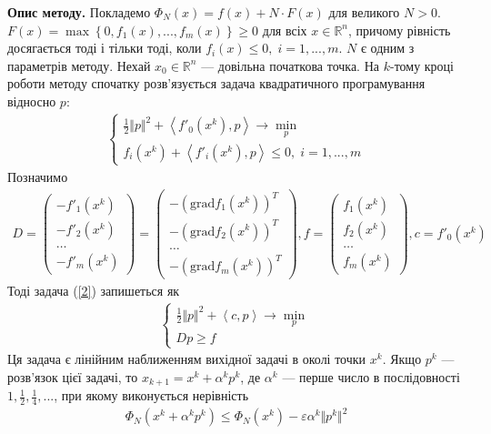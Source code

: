 \documentclass{extreport}
\begin{document}
\noindent\textbf{Опис методу.}
Покладемо $\Phi_N (x) = f(x) + N\cdot F(x)$ для великого $N>0$. $F(x) = \max\left\{0, f_1(x), ..., f_m(x)\right\} \geq 0$
для всіх $x \in \mathbb{R}^n$, причому рівність досягається тоді і тільки тоді, коли $f_i(x) \leq 0, \; i = 1,...,m$.
$N$ є одним з параметрів методу. Нехай $x_0 \in \mathbb{R}^n$ --- довільна початкова точка. На $k$-тому кроці роботи методу спочатку розв'язується
задача квадратичного програмування відносно $p$:
\begin{gather}\label{2}
    \begin{cases}
        \frac{1}{2} \Vert p \Vert^2 + \left<f'_0(x^k), p\right> \to \underset{p}{\min} \\
        f_i(x^k) + \left<f'_i(x^k), p\right> \leq 0, \; i = 1, ..., m
    \end{cases}
\end{gather}
Позначимо
\begin{gather*}
    D = \begin{pmatrix}
        -f'_1 (x^k) \\
        -f'_2 (x^k) \\
        \dots \\
        -f'_m(x^k)
    \end{pmatrix} = 
    \begin{pmatrix}
        -(\mathrm{grad}f_1 (x^k))^T \\
        -(\mathrm{grad}f_2 (x^k))^T \\
        \dots \\
        -(\mathrm{grad}f_m (x^k))^T
    \end{pmatrix},
    f = \begin{pmatrix}
        f_1(x^k) \\
        f_2(x^k) \\
        \dots \\
        f_m(x^k)
    \end{pmatrix},
    c = f'_0(x^k)
\end{gather*}
Тоді задача (\ref{2}) запишеться як
\begin{gather}\label{3}
    \begin{cases}
        \frac{1}{2} \Vert p \Vert^2 + \left<c, p\right> \to \underset{p}{\min} \\
        D p \geq f
    \end{cases}
\end{gather}
Ця задача є лінійним наближенням вихідної задачі в околі точки $x^k$.
Якщо $p^k$ --- розв'язок цієї задачі, то $x_{k+1} = x^k + \alpha^k p^k$, де $\alpha^k$ --- перше число в послідовності $1, \frac{1}{2}, \frac{1}{4}, ...$,
при якому виконується нерівність
\begin{gather}
    \Phi_N (x^k + \alpha^k p^k) \leq \Phi_N(x^k) - \varepsilon \alpha^k \Vert p^k \Vert^2
\end{gather}
\end{document}
